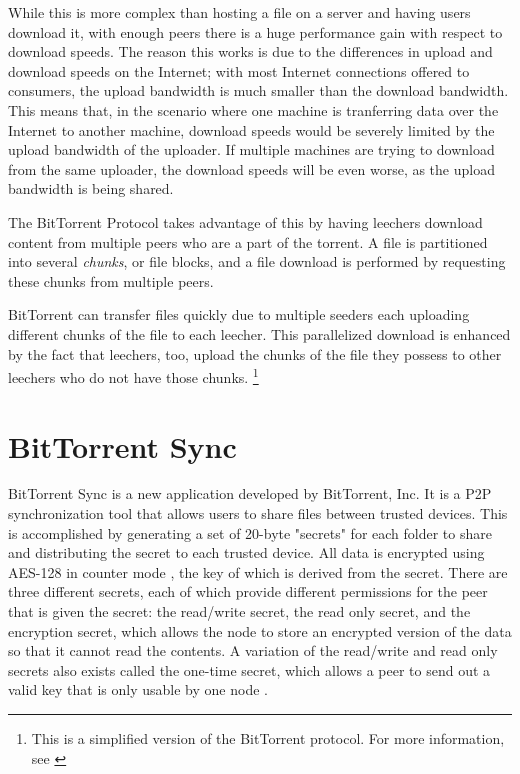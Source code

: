 \documentclass[12pt]{report}
\begin{document}
While this is more complex than hosting a file on a server and having users download it, with enough peers there is a huge performance gain with respect to download speeds. The reason this works is due to the differences in upload and download speeds on the Internet; with most Internet connections offered to consumers, the upload bandwidth is much smaller than the download bandwidth. This means that, in the scenario where one machine is tranferring data over the Internet to another machine, download speeds would be severely limited by the upload bandwidth of the uploader. If multiple machines are trying to download from the same uploader, the download speeds will be even worse, as the upload bandwidth is being shared.

The BitTorrent Protocol takes advantage of this by having leechers download content from multiple peers who are a part of the torrent. A file is partitioned into several \textit{chunks}, or file blocks, and a file download is performed by requesting these chunks from multiple peers. %

BitTorrent can transfer files quickly due to multiple seeders each uploading different chunks of the file to each leecher. This parallelized download is enhanced by the fact that leechers, too, upload the chunks of the file they possess to other leechers who do not have those chunks. \footnote {This is a simplified version of the BitTorrent protocol. For more information, see \cite{bittorrentProtocol}}

\section{BitTorrent Sync}
BitTorrent Sync is a new application developed by BitTorrent, Inc. It is a P2P synchronization tool that allows users to share files between trusted devices. This is accomplished by generating a set of 20-byte "secrets" for each folder to share and distributing the secret to each trusted device. All data is encrypted using AES-128 in counter mode \cite{btsynctech}, the key of which is derived from the secret. There are three different secrets, each of which provide different permissions for the peer that is given the secret: the read/write secret, the read only secret, and the encryption secret, which allows the node to store an encrypted version of the data so that it cannot read the contents. A variation of the read/write and read only secrets also exists called the one-time secret, which allows a peer to send out a valid key that is only usable by one node \cite{btsyncuserguide}.
\end{document}
